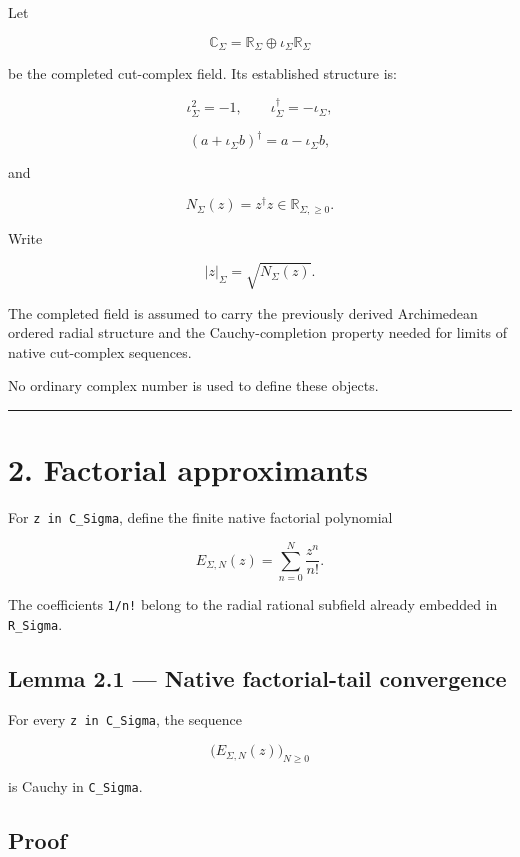 Let

\[
\mathbb C_\Sigma
=
\mathbb R_\Sigma\oplus \iota_\Sigma\mathbb R_\Sigma
\]

be the completed cut-complex field. Its established structure is:

\[
\iota_\Sigma^2=-1,
\qquad
\iota_\Sigma^\dagger=-\iota_\Sigma,
\]

\[
(a+\iota_\Sigma b)^\dagger
=a-\iota_\Sigma b,
\]

and

\[
N_\Sigma(z)=z^\dagger z\in\mathbb R_{\Sigma,\ge0}.
\]

Write

\[
|z|_\Sigma=\sqrt{N_\Sigma(z)}.
\]

The completed field is assumed to carry the previously derived Archimedean
ordered radial structure and the Cauchy-completion property needed for limits of
native cut-complex sequences.

No ordinary complex number is used to define these objects.

\begin{center}\rule{0.5\linewidth}{0.5pt}\end{center}

\hypertarget{factorial-approximants}{%
\section{2. Factorial approximants}\label{factorial-approximants}}

For \texttt{z\ in\ C\_Sigma}, define the finite native factorial polynomial

\[
E_{\Sigma,N}(z)
=
\sum_{n=0}^{N}\frac{z^n}{n!}.
\]

The coefficients \texttt{1/n!} belong to the radial rational subfield already embedded
in \texttt{R\_Sigma}.

\hypertarget{lemma-2.1-native-factorial-tail-convergence}{%
\subsection{Lemma 2.1 --- Native factorial-tail convergence}\label{lemma-2.1-native-factorial-tail-convergence}}

For every \texttt{z\ in\ C\_Sigma}, the sequence

\[
\bigl(E_{\Sigma,N}(z)\bigr)_{N\ge0}
\]

is Cauchy in \texttt{C\_Sigma}.

\hypertarget{proof}{%
\subsection{Proof}\label{proof}}

